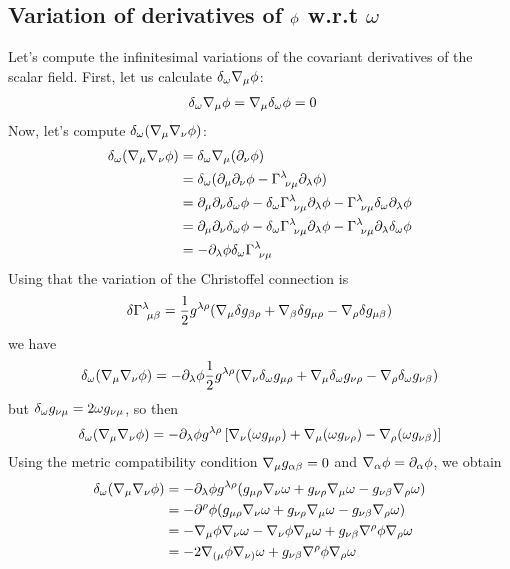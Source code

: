\subsection{Variation of derivatives of $\phi$ w.r.t $\omega$}
Let's compute the infinitesimal variations of the covariant derivatives of the scalar field. First, let us calculate $\delta_\omega \nabla_\mu \phi $:
\begin{align}
  \delta_\omega\nabla_\mu \phi&=\nabla_\mu \delta_\omega\phi=0 \label{delta-nabla}
\end{align}
Now, let's compute $\delta_\omega (\nabla_\mu \nabla_\nu \phi )$:
\begin{align}
  \delta_\omega (\nabla_\mu \nabla_\nu \phi )&=\delta_\omega \nabla_\mu (\partial_\nu \phi )\\
  &=\delta_\omega(\partial_\mu \partial_\nu \phi -\Gamma^\lambda_{~\nu\mu }\partial_\lambda \phi )\\
  &=\partial_\mu \partial_\nu \delta_\omega\phi -\delta_\omega\Gamma^\lambda_{~\nu\mu }\partial_\lambda\phi -\Gamma^\lambda_{~\nu\mu }\delta_\omega\partial_\lambda\phi \\
  &=\partial_\mu \partial_\nu \delta_\omega\phi -\delta_\omega \Gamma^\lambda_{~\nu\mu }\partial_\lambda\phi -\Gamma^\lambda_{~\nu\mu }\partial_\lambda \delta_\omega \phi \\
  &=-\partial_\lambda\phi \delta_\omega \Gamma^\lambda_{~\nu\mu }
\end{align}
Using that the variation of the Christoffel connection is
\begin{equation}
  \delta \Gamma^\lambda_{~\mu\beta }=\frac{1}{2}g^{\lambda\rho }(\nabla_\mu \delta g_{\beta\rho }+\nabla_\beta \delta g_{\mu\rho }-\nabla_\rho \delta g_{\mu\beta })
\end{equation}
we have
\begin{equation}
  \delta_\omega(\nabla_\mu \nabla_\nu\phi )=-\partial_\lambda\phi \frac{1}{2}g^{\lambda\rho }(\nabla_\nu \delta_\omega g_{\mu\rho }+\nabla_\mu \delta_\omega g_{\nu\rho }-\nabla_\rho\delta_\omega g_{\nu\beta })
\end{equation}
but $\delta_\omega g_{\nu\mu }=2\omega g_{\nu\mu }$, so then
\begin{equation}
   \delta_\omega(\nabla_\mu \nabla_\nu\phi )=-\partial_\lambda\phi g^{\lambda\rho }\left[\nabla_\nu (\omega g_{\mu\rho })+\nabla_\mu (\omega g_{\nu\rho })-\nabla_\rho (\omega g_{\nu\beta })\right]
\end{equation}
Using the metric compatibility condition $\nabla_\mu g_{\alpha\beta }=0$ and $\nabla_\alpha\phi =\partial_\alpha\phi  $, we obtain
\begin{align}
   \delta_\omega(\nabla_\mu \nabla_\nu\phi )&=-\partial_\lambda\phi g^{\lambda\rho }(g_{\mu\rho }\nabla_\nu \omega+g_{\nu\rho }\nabla_\mu \omega-g_{\nu\beta }\nabla_\rho \omega)\\
   &=-\partial^\rho \phi (g_{\mu\rho }\nabla_\nu \omega+g_{\nu\rho }\nabla_\mu \omega-g_{\nu\beta }\nabla_\rho \omega)\\
   &=-\nabla_\mu \phi\nabla_\nu \omega-\nabla_\nu \phi \nabla_\mu \omega +g_{\nu\beta }\nabla^\rho \phi\nabla_\rho\omega\\
   &=-2\nabla_{(\mu }\phi\nabla_{\nu)}\omega+g_{\nu\beta }\nabla^\rho \phi\nabla_\rho\omega \label{delta-nabla-nabla}
\end{align}


